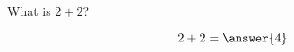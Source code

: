 \documentclass{ximera}
\author{Bart Snapp}
\begin{document}
\begin{problem}
  What is $2+2$?
  \begin{prompt}
    \[
    2+2 = \answer{4}
    \]
  \end{prompt}
\end{problem}
\end{document}
